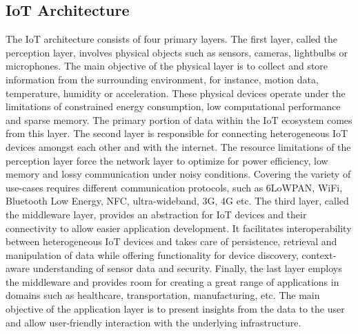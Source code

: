 \documentclass[conference, 11pt]{IEEEtran}
\begin{document}
\subsection{IoT Architecture}
The IoT architecture consists of four primary layers. The first layer, called the perception layer, involves physical objects such as sensors, cameras, lightbulbs or microphones.
The main objective of the physical layer is to collect and store information from the surrounding environment, for instance, motion data, temperature, humidity or acceleration.
These physical devices operate under the limitations of constrained energy consumption, low computational performance and sparse memory.
The primary portion of data within the IoT ecosystem comes from this layer. The second layer is responsible for connecting heterogeneous IoT devices amongst each other and with the internet.
The resource limitations of the perception layer force the network layer to optimize for power efficiency, low memory and lossy communication under noisy conditions.
Covering the variety of use-cases requires different communication protocols, such as 6LoWPAN, WiFi, Bluetooth Low Energy, NFC, ultra-wideband, 3G, 4G etc.
The third layer, called the middleware layer, provides an abstraction for IoT devices and their connectivity to allow easier application development.
It facilitates interoperability between heterogeneous IoT devices and takes care of persistence, retrieval and manipulation of data while offering functionality for device discovery, context-aware understanding of sensor data and security.
Finally, the last layer employs the middleware and provides room for creating a great range of applications in domains such as healthcare, transportation, manufacturing, etc. The main objective of the application layer is to present insights from the data to the user and allow user-friendly interaction with the underlying infrastructure.
\end{document}

